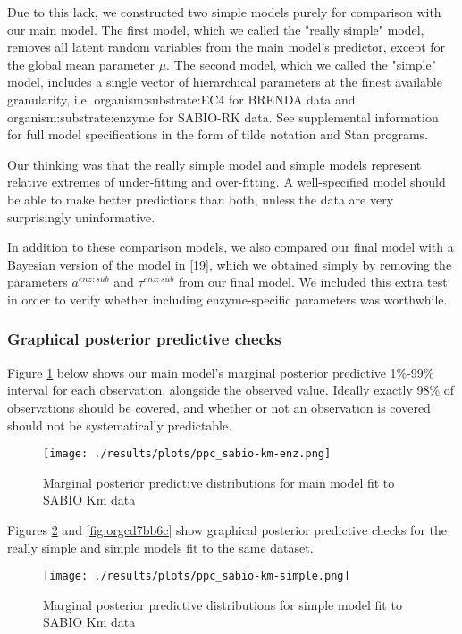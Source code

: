 \documentclass[11pt]{article}
\makeatletter
\newcommand{\citeprocitem}[2]{\hyper@linkstart{cite}{citeproc_bib_item_#1}#2\hyper@linkend}
\makeatother
\begin{document}
Due to this lack, we constructed two simple models purely for comparison with
our main model. The first model, which we called the "really simple" model,
removes all latent random variables from the main model's predictor, except for
the global mean parameter \(\mu\). The second model, which we called the "simple"
model, includes a single vector of hierarchical parameters at the finest
available granularity, i.e. organism:substrate:EC4 for BRENDA data and
organism:substrate:enzyme for SABIO-RK data. See supplemental information for
full model specifications in the form of tilde notation and Stan programs.

Our thinking was that the really simple model and simple models represent
relative extremes of under-fitting and over-fitting. A well-specified model
should be able to make better predictions than both, unless the data are very
surprisingly uninformative.

In addition to these comparison models, we also compared our final model with a
Bayesian version of the model in \citeprocitem{19}{[19]},
which we obtained simply by removing the parameters \(a^{enz:sub}\) and
\(\tau^{enz:sub}\) from our final model. We included this extra test in order to
verify whether including enzyme-specific parameters was worthwhile.

\subsubsection{Graphical posterior predictive checks}
\label{sec:orgd9d5534}
Figure \ref{fig:org9c97ea3} below shows our main model's marginal posterior
predictive 1\%-99\% interval for each observation, alongside the observed
value. Ideally exactly 98\% of observations should be covered, and whether or not
an observation is covered should not be systematically predictable.

\begin{figure}[htbp]
\centering
\texttt{[image: ./results/plots/ppc\_sabio-km-enz.png]}
\caption{\label{fig:org9c97ea3}Marginal posterior predictive distributions for main model fit to SABIO Km data}
\end{figure}

Figures \ref{fig:orgb7e73ec} and \ref{fig:orgcd7bb6c} show
graphical posterior predictive checks for the really simple and simple models
fit to the same dataset.

\begin{figure}[htbp]
\centering
\texttt{[image: ./results/plots/ppc\_sabio-km-simple.png]}
\caption{\label{fig:orgb7e73ec}Marginal posterior predictive distributions for simple model fit to SABIO Km data}
\end{figure}
\end{document}
